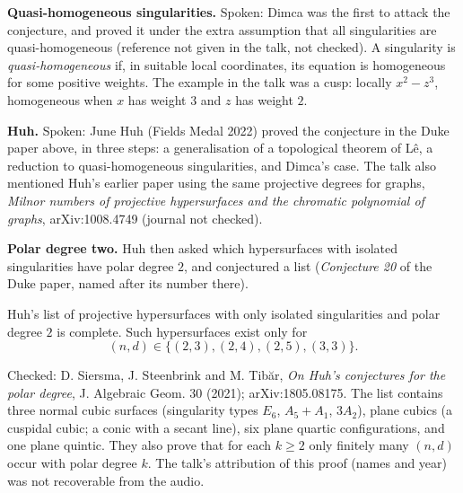 \medskip\noindent
{\bf Quasi-homogeneous singularities.}
Spoken: Dimca was the first to attack the
conjecture, and proved it under the extra
assumption that all singularities are
quasi-homogeneous (reference not given in
the talk, not checked). A singularity is
\emph{quasi-homogeneous} if, in suitable
local coordinates, its equation is
homogeneous for some positive weights. The
example in the talk was a cusp: locally
$x^2 - z^3$, homogeneous when $x$ has weight
$3$ and $z$ has weight $2$.

\medskip\noindent
{\bf Huh.} Spoken: June Huh (Fields Medal
2022) proved the conjecture in the Duke paper
above, in three steps: a generalisation of a
topological theorem of L\^e, a reduction to
quasi-homogeneous singularities, and Dimca's
case. The talk also mentioned Huh's earlier
paper using the same projective degrees for
graphs, \emph{Milnor numbers of projective
hypersurfaces and the chromatic polynomial of
graphs}, arXiv:1008.4749 (journal not
checked).

\medskip\noindent
{\bf Polar degree two.} Huh then asked which
hypersurfaces with isolated singularities
have polar degree $2$, and conjectured a list
(\emph{Conjecture 20} of the Duke paper,
named after its number there).

\begin{theorem}
\label{theorem-polar-degree-two}
Huh's list of projective hypersurfaces with
only isolated singularities and polar degree
$2$ is complete. Such hypersurfaces exist
only for
$$
(n,d) \in \{(2,3),(2,4),(2,5),(3,3)\}.
$$
\end{theorem}

\noindent
Checked: D. Siersma, J. Steenbrink and
M. Tib\u{a}r, \emph{On Huh's conjectures for
the polar degree}, J. Algebraic Geom. 30
(2021); arXiv:1805.08175. The list contains
three normal cubic surfaces (singularity
types $E_6$, $A_5 + A_1$, $3A_2$), plane
cubics (a cuspidal cubic; a conic with a
secant line), six plane quartic
configurations, and one plane quintic. They
also prove that for each $k \ge 2$ only
finitely many $(n,d)$ occur with polar degree
$k$. The talk's attribution of this proof
(names and year) was not recoverable from the
audio.

